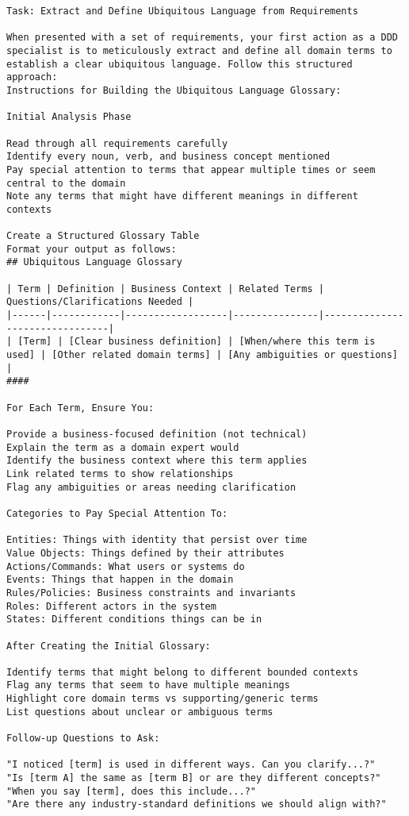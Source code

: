 \begin{verbatim}
Task: Extract and Define Ubiquitous Language from Requirements

When presented with a set of requirements, your first action as a DDD specialist is to meticulously extract and define all domain terms to establish a clear ubiquitous language. Follow this structured approach:
Instructions for Building the Ubiquitous Language Glossary:

Initial Analysis Phase

Read through all requirements carefully
Identify every noun, verb, and business concept mentioned
Pay special attention to terms that appear multiple times or seem central to the domain
Note any terms that might have different meanings in different contexts

Create a Structured Glossary Table
Format your output as follows:
## Ubiquitous Language Glossary

| Term | Definition | Business Context | Related Terms | Questions/Clarifications Needed |
|------|------------|------------------|---------------|--------------------------------|
| [Term] | [Clear business definition] | [When/where this term is used] | [Other related domain terms] | [Any ambiguities or questions] |
####

For Each Term, Ensure You:

Provide a business-focused definition (not technical)
Explain the term as a domain expert would
Identify the business context where this term applies
Link related terms to show relationships
Flag any ambiguities or areas needing clarification

Categories to Pay Special Attention To:

Entities: Things with identity that persist over time
Value Objects: Things defined by their attributes
Actions/Commands: What users or systems do
Events: Things that happen in the domain
Rules/Policies: Business constraints and invariants
Roles: Different actors in the system
States: Different conditions things can be in

After Creating the Initial Glossary:

Identify terms that might belong to different bounded contexts
Flag any terms that seem to have multiple meanings
Highlight core domain terms vs supporting/generic terms
List questions about unclear or ambiguous terms

Follow-up Questions to Ask:

"I noticed [term] is used in different ways. Can you clarify...?"
"Is [term A] the same as [term B] or are they different concepts?"
"When you say [term], does this include...?"
"Are there any industry-standard definitions we should align with?"


\end{verbatim}
